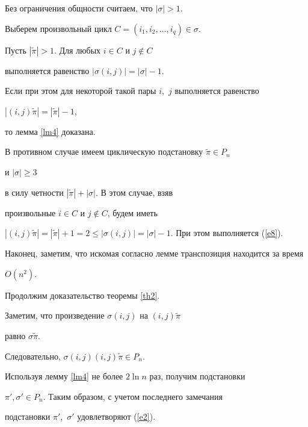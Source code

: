 \begin{pf}


Без ограничения общности считаем, что $|\sigma| > 1$.


Выберем произвольный цикл $C = (i_1, i_2, \dotsc, i_q) \in \sigma$.





Пусть $|\widetilde{\pi}| > 1$. Для любых $i \in C$ и $j \notin C$


выполняется равенство $ |\sigma (i,j)|= |\sigma| - 1$. 


Если при этом для некоторой такой пары $i$,~$j$ выполняется равенство


$|(i,j) \widetilde{\pi}| = |\widetilde{\pi}| - 1$,


то лемма \ref{lm4} доказана.


В противном случае имеем циклическую подстановку $\widetilde{\pi} \in P_n$ 


и $|\sigma| \ge 3$


в силу четности $|\widetilde{\pi}| + |\sigma|$. В этом случае, взяв 


произвольные $ i \in C $ и $j \notin C$, будем иметь


$|(i,j) \widetilde{\pi}| = |\widetilde{\pi}| + 1 = 2 \le |\sigma (i,j)| 


= |\sigma| - 1$. При этом выполняется (\ref {e8}).





Наконец, заметим, что искомая согласно лемме транспозиция находится за время


$O(n^2)$.


\end{pf}





Продолжим доказательство теоремы \ref{th2}.


Заметим, что произведение $\sigma (i,j)$ на $(i,j) \widetilde{\pi}$ 


равно $ \sigma \widetilde{\pi}. $


Следовательно, $\sigma (i,j)(i,j) \widetilde\pi \in P_n$.





Используя лемму \ref{lm4} не более $ 2 \ln n $ раз, получим подстановки 


$\pi', \sigma' \in P_n$. Таким образом, с учетом последнего замечания


подстановки $\pi'$,~$\sigma'$ удовлетворяют (\ref{e2}).


